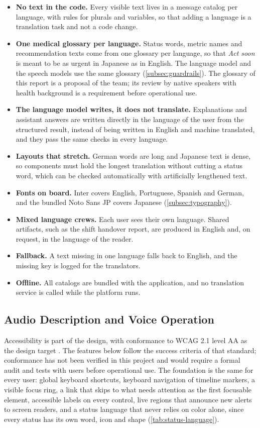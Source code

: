\begin{itemize}
\item \textbf{No text in the code.} Every visible text lives in a message catalog per language, with rules for plurals and variables, so that adding a language is a translation task and not a code change.
\item \textbf{One medical glossary per language.} Status words, metric names and recommendation texts come from one glossary per language, so that \textit{Act soon} is meant to be as urgent in Japanese as in English. The language model and the speech models use the same glossary (\ref{subsec:guardrails}). The glossary of this report is a proposal of the team; its review by native speakers with health background is a requirement before operational use.
\item \textbf{The language model writes, it does not translate.} Explanations and assistant answers are written directly in the language of the user from the structured result, instead of being written in English and machine translated, and they pass the same checks in every language.
\item \textbf{Layouts that stretch.} German words are long and Japanese text is dense, so components must hold the longest translation without cutting a status word, which can be checked automatically with artificially lengthened text.
\item \textbf{Fonts on board.} Inter covers English, Portuguese, Spanish and German, and the bundled Noto Sans JP covers Japanese (\ref{subsec:typography}).
\item \textbf{Mixed language crews.} Each user sees their own language. Shared artifacts, such as the shift handover report, are produced in English and, on request, in the language of the reader.
\item \textbf{Fallback.} A text missing in one language falls back to English, and the missing key is logged for the translators.
\item \textbf{Offline.} All catalogs are bundled with the application, and no translation service is called while the platform runs.
\end{itemize}

\subsection{Audio Description and Voice Operation}
\label{subsec:accessibility}

Accessibility is part of the design, with conformance to WCAG 2.1 level AA as the design target \cite{w3c_wcag21}. The features below follow the success criteria of that standard; conformance has not been verified in this project and would require a formal audit and tests with users before operational use. The foundation is the same for every user: global keyboard shortcuts, keyboard navigation of timeline markers, a visible focus ring, a link that skips to what needs attention as the first focusable element, accessible labels on every control, live regions that announce new alerts to screen readers, and a status language that never relies on color alone, since every status has its own word, icon and shape (\ref{tab:status-language}).

